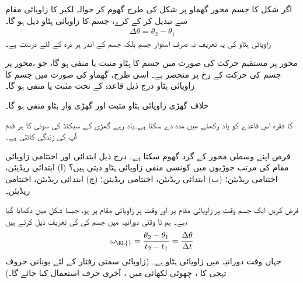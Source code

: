 اگر شکل   کا جسم  محور گھماو پر شکل   کی طرح  گھوم کر حوالہ لکیر کا زاویائی مقام  سے  تبدیل کر کے   کرے، جسم کا زاویائی ہٹاو   ذیل ہو گا۔
\begin{align}
\Delta \theta=\theta_2-\theta_1
\end{align}
زاویائی ہٹاو کی یہ تعریف نہ صرف استوار جسم بلکہ جسم کے  اندر  ہر ذرہ کے لئے درست ہے۔

محور  پر  مستقیم حرکت کی صورت میں جسم کا ہٹاو   مثبت یا منفی ہو گا، جو  ،محور پر جسم کی حرکت کے رخ پر منحصر ہے۔ اسی طرح، گھماو کی صورت میں جسم کا  زاویائی ہٹاو  درج ذیل قاعدہ کے تحت  مثبت یا منفی ہو گا۔

خلاف گھڑی زاویائی ہٹاو مثبت اور گھڑی وار ہٹاو منفی ہو گا۔

 کا فقرہ اس قاعدے کو یاد رکھنے  میں مدد دے سکتا ہے۔یاد رہے  گھڑی  کے سیکنڈ   کی سوئی کا ہر قدم آپ کی زندگی کاٹتی ہے۔

قرص اپنے وسطی محور کے گرد گھوم سکتا ہے۔ درج ذیل  ابتدائی  اور اختتامی زاویائی مقام کی  مرتب جوڑیوں میں کونسی  منفی زاویائی ہٹاو دیتی ہیں؟ (ا)  ابتدائی   ریڈیئن، اختتامی  ریڈیئن؛ 
(ب)   ابتدائی   ریڈیئن، اختتامی  ریڈیئن؛  (ج)   ابتدائی   ریڈیئن، اختتامی  ریڈیئن۔

فرض کریں ایک جسم وقت  پر زاویائی مقام  پر اور  وقت  پر زاویائی مقام  پر  ہو، جیسا شکل  میں دکھایا گیا ہے۔  ہم  تا  وقتی دورانیہ  میں جسم کی    کی تعریف ذیل کرتے ہیں،
\begin{align}
\omega_{\text{\RL{}}}=\frac{\theta_2-\theta_1}{t_2-t_1}=\frac{\Delta \theta}{\Delta t}
\end{align}
جہاں وقت دورانیہ  میں زاویائی ہٹاو  ہے۔ (زاویائی سمتی رفتار کے لئے یونانی  حروف  تہجی کا ، چھوٹی لکھائی میں  ،  آخری حرف     استعمال کیا جائے گا۔)
